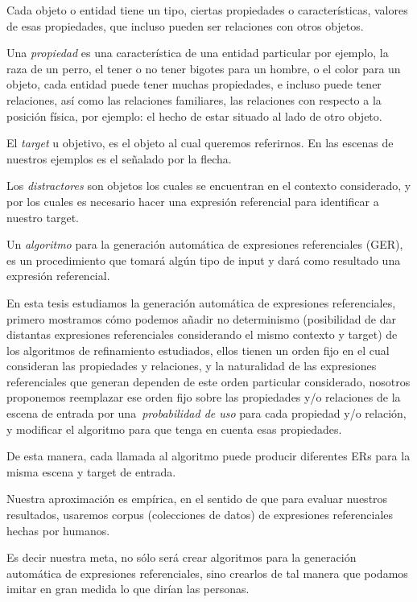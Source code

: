 Cada objeto o entidad tiene un tipo, ciertas propiedades o caracter\'isticas, valores de esas propiedades, que incluso pueden ser relaciones con otros objetos.

Una {\it propiedad} es una caracter\'istica de una entidad particular por ejemplo, la raza de un perro, el tener o no tener bigotes para un hombre, o el color para un objeto, cada entidad puede tener muchas propiedades, e incluso puede tener relaciones, as\'i como las relaciones familiares, las relaciones con respecto a la posici\'on f\'isica, por ejemplo: el hecho de estar situado al lado de otro objeto.

El \emph{target} u objetivo, es el objeto al cual queremos referirnos. En las escenas de nuestros ejemplos es el se\~nalado por la flecha.

Los \emph{distractores} son objetos los cuales se encuentran en el contexto considerado, y por los cuales es necesario hacer una expresi\'on referencial para identificar a nuestro target. 

Un {\it algoritmo} para la generaci\'on autom\'atica de expresiones referenciales (GER), es un procedimiento que tomar\'a alg\'un tipo de input y dar\'a como resultado una expresi\'on referencial.

En esta tesis estudiamos la generaci\'on autom\'atica de expresiones referenciales, 
primero mostramos c\'omo podemos a\~nadir no determinismo (posibilidad de dar distantas expresiones referenciales considerando el mismo contexto y target) de los algoritmos de refinamiento estudiados, ellos tienen un orden fijo en el cual consideran las propiedades y relaciones, y la naturalidad de las expresiones referenciales que generan dependen de este orden particular considerado, nosotros proponemos reemplazar ese orden fijo
sobre las propiedades y/o relaciones de la escena de entrada por una~\emph{probabilidad de uso} para cada propiedad y/o relaci\'on, y modificar el algoritmo para que tenga en cuenta esas propiedades.

De esta manera, cada llamada al algoritmo puede producir diferentes ERs para la misma escena y target de entrada. 

Nuestra aproximaci\'on es emp\'irica, en el sentido de que para evaluar nuestros resultados, usaremos corpus (colecciones de datos) de expresiones referenciales hechas por humanos.

Es decir nuestra meta, no s\'olo ser\'a crear algoritmos para la generaci\'on autom\'atica de expresiones referenciales, sino crearlos de tal manera que podamos imitar en gran medida lo que dir\'ian las personas.

